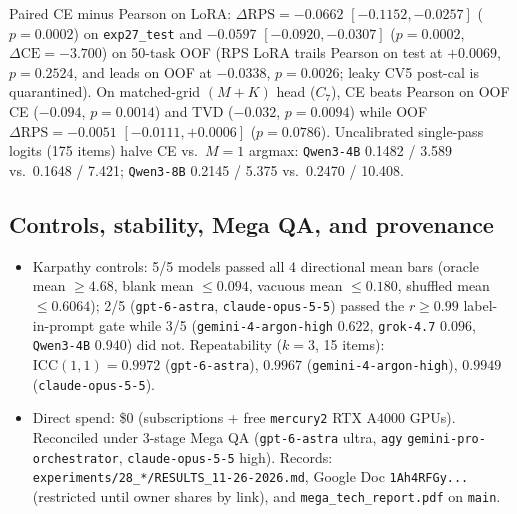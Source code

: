 Paired CE minus Pearson on LoRA: $\Delta\mathrm{RPS} = -0.0662$ $[-0.1152, -0.0257]$ ($p = 0.0002$) on \texttt{exp27\_test} and $-0.0597$ $[-0.0920, -0.0307]$ ($p = 0.0002$, $\Delta\mathrm{CE} = -3.700$) on 50-task OOF (RPS LoRA trails Pearson on test at $+0.0069$, $p=0.2524$, and leads on OOF at $-0.0338$, $p=0.0026$; leaky CV5 post-cal is quarantined). On matched-grid $(M+K)$ head ($C_7$), CE beats Pearson on OOF CE ($-0.094$, $p=0.0014$) and TVD ($-0.032$, $p=0.0094$) while OOF $\Delta\mathrm{RPS} = -0.0051$ $[-0.0111, +0.0006]$ ($p=0.0786$). Uncalibrated single-pass logits (175 items) halve CE vs.\ $M=1$ argmax: \texttt{Qwen3-4B} 0.1482 / 3.589 vs.\ 0.1648 / 7.421; \texttt{Qwen3-8B} 0.2145 / 5.375 vs.\ 0.2470 / 10.408.

\subsection*{Controls, stability, Mega QA, and provenance}
\begin{itemize}
  \item Karpathy controls: 5/5 models passed all 4 directional mean bars (oracle mean $\ge 4.68$, blank mean $\le 0.094$, vacuous mean $\le 0.180$, shuffled mean $\le 0.6064$); 2/5 (\texttt{gpt-6-astra}, \texttt{claude-opus-5-5}) passed the $r \ge 0.99$ label-in-prompt gate while 3/5 (\texttt{gemini-4-argon-high} $0.622$, \texttt{grok-4.7} $0.096$, \texttt{Qwen3-4B} $0.940$) did not. Repeatability ($k=3$, 15 items): $\mathrm{ICC}(1,1) = 0.9972$ (\texttt{gpt-6-astra}), $0.9967$ (\texttt{gemini-4-argon-high}), $0.9949$ (\texttt{claude-opus-5-5}).
  \item Direct spend: \$0 (subscriptions + free \texttt{mercury2} RTX A4000 GPUs). Reconciled under 3-stage Mega QA (\texttt{gpt-6-astra} ultra, \texttt{agy} \texttt{gemini-pro-orchestrator}, \texttt{claude-opus-5-5} high). Records: \texttt{experiments/28\_*/RESULTS\_11-26-2026.md}, Google Doc \texttt{1Ah4RFGy...} (restricted until owner shares by link), and \texttt{mega\_tech\_report.pdf} on \texttt{main}.
\end{itemize}
